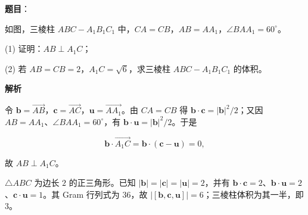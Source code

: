 \begin{answer}

\textbf{题目}：

如图，三棱柱 $ABC-A_1B_1C_1$ 中，$CA=CB$，$AB=AA_1$，$\angle BAA_1=60^\circ$。
\nopagebreak[4]
\begin{center}\end{center}
\nopagebreak[4]
(1) 证明：$AB\perp A_1C$；

(2) 若 $AB=CB=2$，$A_1C=\sqrt6$，求三棱柱 $ABC-A_1B_1C_1$ 的体积。

\textbf{解析}


令 $\boldsymbol b=\overrightarrow{AB}$，$\boldsymbol c=\overrightarrow{AC}$，$\boldsymbol u=\overrightarrow{AA_1}$。由 $CA=CB$ 得 $\boldsymbol b\cdot\boldsymbol c=|\boldsymbol b|^2/2$；又因 $AB=AA_1$、$\angle BAA_1=60^\circ$，有 $\boldsymbol b\cdot\boldsymbol u=|\boldsymbol b|^2/2$。于是

\nopagebreak[4]
\[
\boldsymbol b\cdot\overrightarrow{A_1C}
=\boldsymbol b\cdot(\boldsymbol c-\boldsymbol u)=0,
\]

故 $AB\perp A_1C$。


$\triangle ABC$ 为边长 $2$ 的正三角形。已知 $|\boldsymbol b|=|\boldsymbol c|=|\boldsymbol u|=2$，并有 $\boldsymbol b\cdot\boldsymbol c=2$、$\boldsymbol b\cdot\boldsymbol u=2$、$\boldsymbol c\cdot\boldsymbol u=1$。其 Gram 行列式为 $36$，故 $|[\boldsymbol b,\boldsymbol c,\boldsymbol u]|=6$；三棱柱体积为其一半，即 $3$。



\end{answer}
